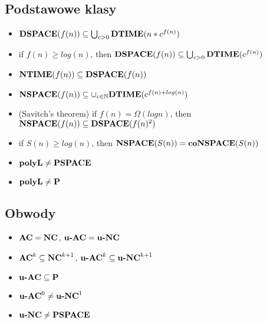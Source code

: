 \subsection{Podstawowe klasy}
\begin{itemize}
    \item $\DSPACE(f(n)) \subseteq  \bigcup_{c >0} \DTIME(n * c^{f(n)})$ 
    \item if $f(n) \geq log(n)$, then $\DSPACE(f(n)) \subseteq  \bigcup_{c >0} \DTIME(c^{f(n)})$
   
    \item $\NTIME(f(n)) \subseteq \DSPACE(f(n))$
    \item $\NSPACE(f(n)) \subseteq \cup_{c \in \mathbb{N}} \DTIME(c^{f(n) + log(n)})$
    \item (Savitch's theorem) if $f(n)=\Omega(log n)$, then $\NSPACE(f(n)) \subseteq \DSPACE(f(n)^2)$
    \item if $S(n) \geq log(n)$, then $\NSPACE(S(n))= \co\NSPACE(S(n))$
    \item $\textbf{polyL} \neq \PSPACE$
    \item $\textbf{polyL} \neq \P$

\end{itemize}
\subsection{Obwody}
\begin{itemize}
    \item $\AC = \NC$, $\u\AC = \u\NC$
    \item $\AC^k \subseteq \NC^{k+1}$, $\u\AC^k \subseteq \u\NC^{k+1}$ 
    \item $\u\AC \subseteq \P$
    \item $\u\AC^0 \neq \u\NC^1$
    \item $\u\NC \neq \PSPACE$
\end{itemize}
